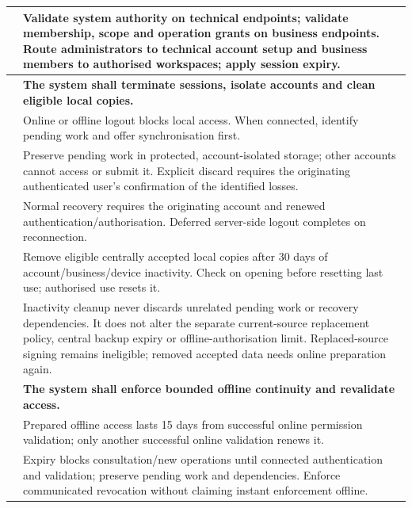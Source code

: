 {\begin{longtable}{L{0.18}L{0.82}}
\label{ac:002:b} & Validate system authority on technical endpoints; validate membership, scope and operation grants on business endpoints. Route administrators to technical account setup and business members to authorised workspaces; apply session expiry.\\
\midrule
{}
\label{fr:003}\textbf{} & \textbf{The system shall terminate sessions, isolate accounts and clean eligible local copies.}\\*
\label{ac:003:a} & Online or offline logout blocks local access. When connected, identify pending work and offer synchronisation first.\\
\label{ac:003:b} & Preserve pending work in protected, account-isolated storage; other accounts cannot access or submit it. Explicit discard requires the originating authenticated user's confirmation of the identified losses.\\
\label{ac:003:c} & Normal recovery requires the originating account and renewed authentication/authorisation. Deferred server-side logout completes on reconnection.\\
\label{ac:003:d} & Remove eligible centrally accepted local copies after 30 days of account/business/device inactivity. Check on opening before resetting last use; authorised use resets it.\\
\label{ac:003:e} & Inactivity cleanup never discards unrelated pending work or recovery dependencies. It does not alter the separate current-source replacement policy, central backup expiry or offline-authorisation limit. Replaced-source signing remains ineligible; removed accepted data needs online preparation again.\\
\midrule
{}
\label{fr:004}\textbf{} & \textbf{The system shall enforce bounded offline continuity and revalidate access.}\\*
\label{ac:004:a} & Prepared offline access lasts 15 days from successful online permission validation; only another successful online validation renews it.\\
\label{ac:004:b} & Expiry blocks consultation/new operations until connected authentication and validation; preserve pending work and dependencies. Enforce communicated revocation without claiming instant enforcement offline.\\

\end{longtable}}
